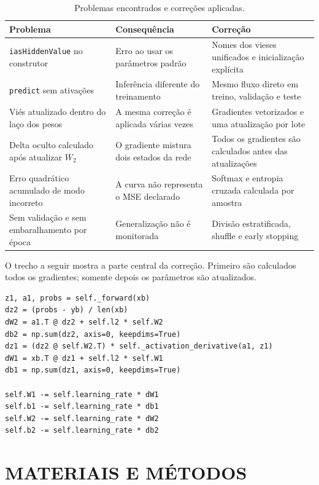 \documentclass[12pt,a4paper,oneside,openany,chapter=TITLE,section=TITLE,subsection=TITLE,brazil]{abntex2}
\begin{document}
\begin{table}[H]
\centering
\caption{Problemas encontrados e correções aplicadas.}
\label{tab:depuracao}
\small
\begin{tabularx}{\textwidth}{>{\raggedright\arraybackslash}p{} >{\raggedright\arraybackslash}p{} X}
\toprule
\textbf{Problema} & \textbf{Consequência} & \textbf{Correção} \\
\midrule
\texttt{iasHiddenValue} no construtor & Erro ao usar os parâmetros padrão & Nomes dos vieses unificados e inicialização explícita \\
\texttt{predict} sem ativações & Inferência diferente do treinamento & Mesmo fluxo direto em treino, validação e teste \\
Viés atualizado dentro do laço dos pesos & A mesma correção é aplicada várias vezes & Gradientes vetorizados e uma atualização por lote \\
Delta oculto calculado após atualizar $W_2$ & O gradiente mistura dois estados da rede & Todos os gradientes são calculados antes das atualizações \\
Erro quadrático acumulado de modo incorreto & A curva não representa o MSE declarado & Softmax e entropia cruzada calculada por amostra \\
Sem validação e sem embaralhamento por época & Generalização não é monitorada & Divisão estratificada, shuffle e early stopping \\
\bottomrule
\end{tabularx}
\end{table}

O trecho a seguir mostra a parte central da correção. Primeiro são calculados todos os gradientes; somente depois os parâmetros são atualizados.

\begin{lstlisting}[style=python,caption={Núcleo vetorizado do backpropagation corrigido.}]
z1, a1, probs = self._forward(xb)
dz2 = (probs - yb) / len(xb)
dW2 = a1.T @ dz2 + self.l2 * self.W2
db2 = np.sum(dz2, axis=0, keepdims=True)
dz1 = (dz2 @ self.W2.T) * self._activation_derivative(a1, z1)
dW1 = xb.T @ dz1 + self.l2 * self.W1
db1 = np.sum(dz1, axis=0, keepdims=True)

self.W1 -= self.learning_rate * dW1
self.b1 -= self.learning_rate * db1
self.W2 -= self.learning_rate * dW2
self.b2 -= self.learning_rate * db2
\end{lstlisting}

\chapter{MATERIAIS E MÉTODOS}
\end{document}
